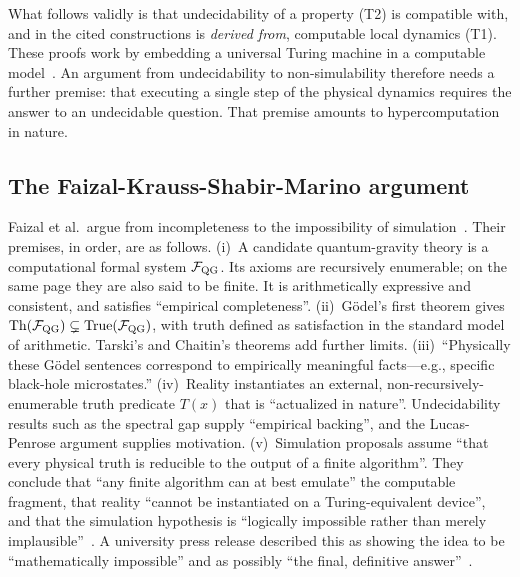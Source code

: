 What follows validly is that undecidability of a property (T2) is compatible
with, and in the cited constructions is \emph{derived from}, computable local
dynamics (T1). These proofs work by embedding a universal Turing machine in a
computable model~\cite{PeralesEceiza2025undecidability}. An argument from
undecidability to non-simulability therefore needs a further premise: that
executing a single step of the physical dynamics requires the answer to an
undecidable question. That premise amounts to hypercomputation in nature.

\subsection{The Faizal-Krauss-Shabir-Marino argument}
\label{sec:complexity:faizal}

Faizal et al.\ argue from incompleteness to the impossibility of
simulation~\cite{Faizal2025consequences}. Their premises, in order, are as
follows.
(i)~A candidate quantum-gravity theory is a computational formal system
$\mathcal F_{\rm QG}$. Its axioms are recursively enumerable; on the same page
they are also said to be finite. It is arithmetically expressive and consistent,
and satisfies ``empirical completeness''.
(ii)~Gödel's first theorem gives $\mathrm{Th}(\mathcal F_{\rm QG})\subsetneq
\mathrm{True}(\mathcal F_{\rm QG})$, with truth defined as satisfaction in the
standard model of arithmetic. Tarski's and Chaitin's theorems add further
limits.
(iii)~``Physically these Gödel sentences correspond to empirically meaningful
facts—e.g., specific black-hole microstates.''
(iv)~Reality instantiates an external, non-recursively-enumerable truth
predicate $T(x)$ that is ``actualized in nature''. Undecidability results such
as the spectral gap supply ``empirical backing'', and the Lucas-Penrose
argument supplies motivation.
(v)~Simulation proposals assume ``that every physical truth is reducible to the
output of a finite algorithm''.
They conclude that ``any finite algorithm can at best emulate'' the computable
fragment, that reality ``cannot be instantiated on a Turing-equivalent
device'', and that the simulation hypothesis is ``logically impossible rather
than merely implausible''~\cite{Faizal2025consequences}. A university press
release described this as showing the idea to be ``mathematically impossible''
and as possibly ``the final, definitive answer''~\cite{UBCO2025physicists}.

